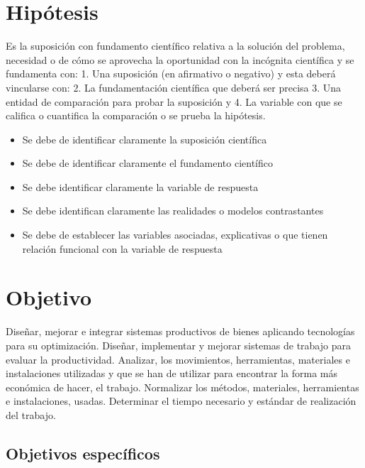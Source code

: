 \section{Hipótesis}

Es la suposición con fundamento científico relativa a la solución del problema, necesidad o de cómo se aprovecha la oportunidad con la incógnita científica y se fundamenta con: 1. Una suposición (en afirmativo o negativo) y esta deberá vincularse con:
2. La fundamentación científica que deberá ser precisa 3. Una entidad de comparación para probar la suposición y
4. La variable con que se califica o cuantifica la comparación o se prueba la hipótesis.

\begin{itemize}
    \item Se debe de identificar claramente la suposición científica
    \item Se debe de identificar claramente el fundamento científico
    \item Se debe identificar claramente la variable de respuesta
    \item Se debe identifican claramente las realidades o modelos contrastantes
    \item Se debe de establecer las variables asociadas, explicativas o que tienen relación funcional con la variable de respuesta
\end{itemize}
% 
% 
\section{Objetivo}

Diseñar, mejorar e integrar sistemas productivos de bienes aplicando tecnologías para su optimización. Diseñar, implementar y mejorar sistemas de trabajo para evaluar la productividad. Analizar, los movimientos, herramientas, materiales e instalaciones utilizadas y que se han de utilizar para encontrar la forma más económica de hacer, el trabajo. Normalizar los métodos, materiales, herramientas e instalaciones, usadas. Determinar el tiempo necesario y estándar de realización del trabajo.


\subsection{Objetivos específicos}


